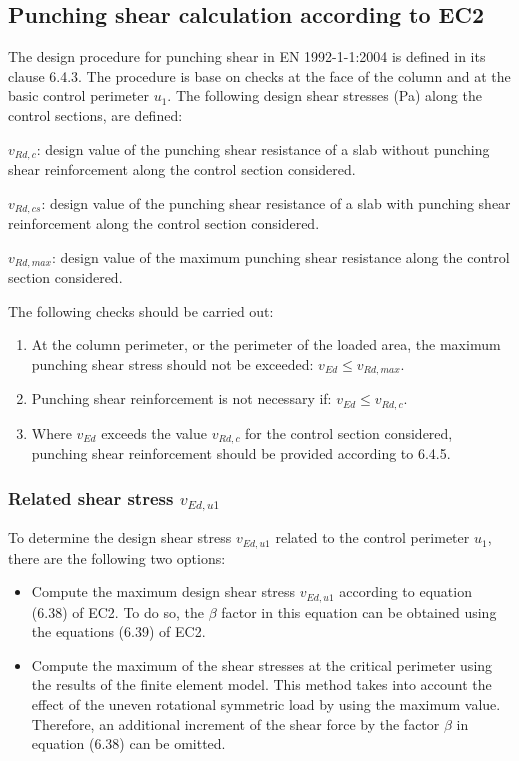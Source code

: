 \subsection{Punching shear calculation according to EC2}
The design procedure for punching shear in EN 1992-1-1:2004 is defined in its clause 6.4.3. The procedure is base on checks at the face of the column and at the basic control perimeter $u_1$. The following design shear stresses (Pa) along the control sections, are defined:

\begin{description}
\item{$v_{Rd,c}$:} design value of the punching shear resistance of a slab without punching shear reinforcement along the control section considered.
\item{$v_{Rd,cs}$:} design value of the punching shear resistance of a slab with punching shear reinforcement along the control section considered.
\item{$v_{Rd,max}$}: design value of the maximum punching shear resistance along the control section considered.
\end{description}

The following checks should be carried out:

\begin{enumerate}
\item At the column perimeter, or the perimeter of the loaded area, the maximum punching shear stress should not be exceeded: $v_{Ed} \leq v_{Rd,max}$.
\item Punching shear reinforcement is not necessary if:  $v_{Ed} \leq v_{Rd,c}$.
\item Where $v_{Ed}$ exceeds the value $v_{Rd,c}$ for the control section considered, punching shear reinforcement should be provided according to 6.4.5.
\end{enumerate}

\subsubsection{Related shear stress $v_{Ed,u1}$}\label{sc_v_Ed1}
To determine the design shear stress $v_{Ed,u1}$ related to the control perimeter $u_1$, there are the following two options:

\begin{itemize}
\item Compute the maximum design shear stress $v_{Ed,u1}$ according to equation (6.38) of EC2. To do so, the $\beta$ factor in this equation can be obtained using the equations (6.39) of EC2.
\item Compute the maximum of the shear stresses at the critical perimeter using the results of the finite element model. This method takes into account the effect of the uneven rotational symmetric load by using the maximum value. Therefore, an additional increment of the shear force by the factor $\beta$ in equation (6.38) can be omitted.
\end{itemize}

